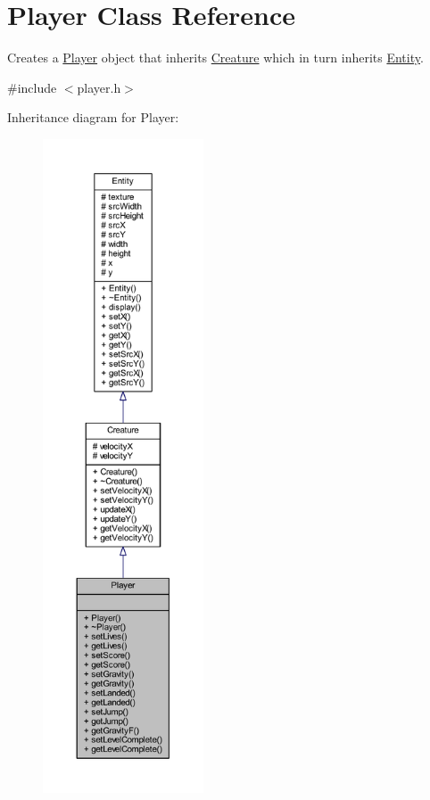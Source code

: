 \hypertarget{class_player}{\section{Player Class Reference}
\label{class_player}
}


Creates a \hyperlink{class_player}{Player} object that inherits \hyperlink{class_creature}{Creature} which in turn inherits \hyperlink{class_entity}{Entity}.  




{\ttfamily \#include $<$player.\+h$>$}



Inheritance diagram for Player\+:
\nopagebreak
\begin{figure}[H]
\begin{center}
\leavevmode
\includegraphics[height=550pt]{class_player__inherit__graph}
\end{center}
\end{figure}


